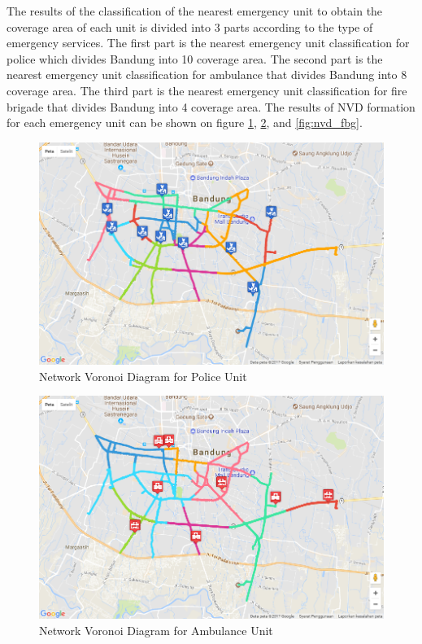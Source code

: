 The results of the classification of the nearest emergency unit to obtain the coverage area of each unit is divided into 3 parts according to the type of emergency services. The first part is the nearest emergency unit classification for police which divides Bandung into 10 coverage area. The second part is the nearest emergency unit classification for ambulance that divides Bandung into 8 coverage area. The third part is the nearest emergency unit classification for fire brigade that divides Bandung into 4 coverage area. The results of NVD formation for each emergency unit can be shown on figure \ref{fig:nvd_pol}, \ref{fig:nvd_amb}, and \ref{fig:nvd_fbg}.

\begin{figure}[H]
    \centering
    \includegraphics[scale=0.6]{v_nvd_pol.png}
    \caption{Network Voronoi Diagram for Police Unit}
    \label{fig:nvd_pol}
\end{figure}

\begin{figure}[H]
    \centering
    \includegraphics[scale=0.6]{v_nvd_amb.png}
    \caption{Network Voronoi Diagram for Ambulance Unit}
    \label{fig:nvd_amb}
\end{figure}


